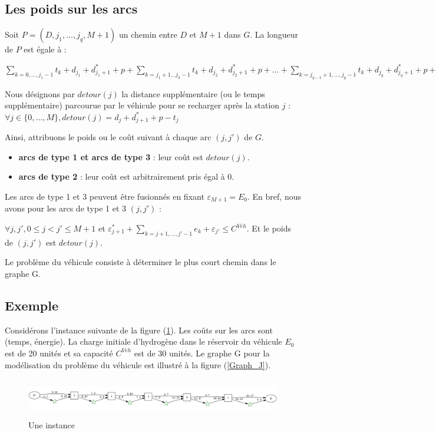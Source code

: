 \subsection{Les poids sur les arcs}
Soit $P=(D, j_1, \dots, j_q, M+1)$ un chemin entre $D$ et $M+1$ dans $G$. La longueur de $P$ est égale à :

$\sum_{k=0, \dots, j_1-1} t_k +d_{j_1} + d^*_{j_1+1}+p+ \sum_{k=j_1+1 \dots j_2-1} t_k +d_{j_2} +d^*_{j_2+1}+p+ \dots+ \sum_{k=j_{q-1}+1, \dots, j_q-1}t_k + d_{j_q} +d^*_{j_q+1}+p+ \sum_{k=j_q+1, \dots, M}t_k = \sum_{k=0, \dots, M} t_k + d_{j_1}+d^*_{j_1+1}+p-t_{j_1}+d_{j_2}+d^*_{j_2+1}+p-t_{j_2}+ \dots +d_{j_q}+d^*_{j_q+1}+p-t_{j_q}$

Nous désignons par $detour(j)$ la distance supplémentaire (ou le temps supplémentaire) parcourue par le véhicule pour se recharger après la station $j$ : $\forall j \in \{0, \dots, M\}, detour(j)=d_j+d^*_{j+1}+p-t_j$

Ainsi, attribuons le poids ou le coût suivant à chaque arc $(j,j')$ de $G$.
\begin{itemize}[label=$\square$]
	\item \textbf{arcs de type 1 et arcs de type 3} : leur coût est $detour(j)$.
	\item \textbf{arcs de type 2} : leur coût est arbitrairement pris égal à 0.
\end{itemize}
Les arcs de type 1 et 3 peuvent être fusionnés en fixant $\varepsilon_{M+1}=E_0$. En bref, nous avons pour les arcs de type 1 et 3 $(j,j')$ :

$\forall j,j', 0\leq j<j'\leq M+1$ et $\varepsilon^*_{j+1}+\sum_{k=j+1, \dots, j'-1}e_k +\varepsilon_{j'} \leq C^{Veh}$. Et le poids de $(j,j')$ est $detour(j)$.

Le problème du véhicule consiste à déterminer le plus court chemin dans le graphe G.

\subsection{Exemple}

Considérons l'instance suivante de la figure (\ref{inst_Graph_J}).
Les coûts sur les arcs sont (temps, énergie). La charge initiale d'hydrogène dans le réservoir du véhicule $E_0$ est de 20 unités et sa capacité $C^{Veh}$ est de 30 unités.
Le graphe G pour la modélisation du problème du véhicule est illustré à la figure (\ref{Graph_J}).

\begin{figure}[H]
	\centerline{
		\includegraphics[height=1.7cm]{images_these/inst_Graph_J.pdf}}
	\caption[Une instance]{Une instance}
	\label{inst_Graph_J}
\end{figure}

